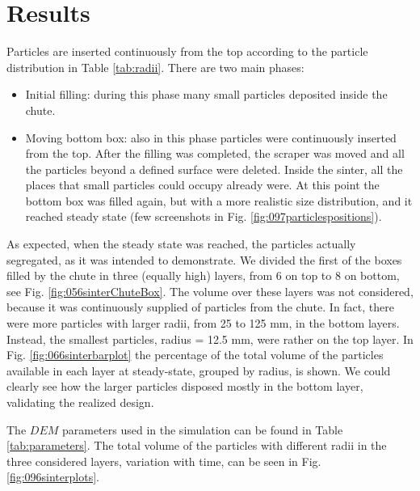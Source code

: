 \section{Results}
\label{sec:results}




Particles are inserted continuously from the top according to the particle
distribution in Table \ref{tab:radii}.
There are two main phases:
\begin{itemize}
  \item{Initial filling: during this phase many small particles deposited inside
  the chute.}
  \item{Moving bottom box: also in this phase particles were
continuously inserted from the top. After the filling was completed, the
scraper was moved and all the particles beyond a defined surface were
deleted. Inside the sinter, all the places that small particles could
occupy already were. At this point the bottom box was filled again, but
with a more realistic size distribution, and it reached steady state 
(few screenshots in Fig. \ref{fig:097particlespositions}).}
\end{itemize}
As expected, when the steady state was reached, the particles actually
segregated, as it was intended to demonstrate.
We divided the first of the boxes
filled by the chute in three (equally high) layers, from 6 on top to 8 
on bottom, see Fig. \ref{fig:056sinterChuteBox}. 
The volume over these layers was not considered, because it was continuously 
supplied of particles from the chute.
In fact, there were more particles with larger radii, from 25 to 125 mm, in the
bottom layers.
Instead, the smallest particles, radius = 12.5 mm, were rather on the top layer. 
In Fig. \ref{fig:066sinterbarplot} the
percentage of the total volume of the particles available in each layer at steady-state, 
grouped by radius, is shown. 
We could clearly see how the larger particles disposed mostly 
in the bottom layer, validating the realized design.




The $DEM$ parameters used in the simulation can be found in Table
\ref{tab:parameters}.
The total volume of the particles with different radii in the three considered
layers, variation with time, can
be seen in Fig. \ref{fig:096sinterplots}.





